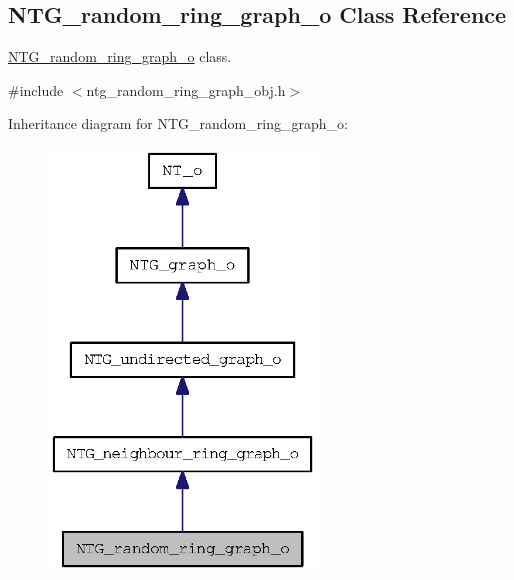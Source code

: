 \subsection{NTG\_\-random\_\-ring\_\-graph\_\-o Class Reference}
\label{class_n_t_g__random__ring__graph__o}


\hyperlink{class_n_t_g__random__ring__graph__o}{NTG\_\-random\_\-ring\_\-graph\_\-o} class.  




{\ttfamily \#include $<$ntg\_\-random\_\-ring\_\-graph\_\-obj.h$>$}



Inheritance diagram for NTG\_\-random\_\-ring\_\-graph\_\-o:
\nopagebreak
\begin{figure}[H]
\begin{center}
\leavevmode
\includegraphics[width=202pt]{class_n_t_g__random__ring__graph__o__inherit__graph}
\end{center}
\end{figure}


